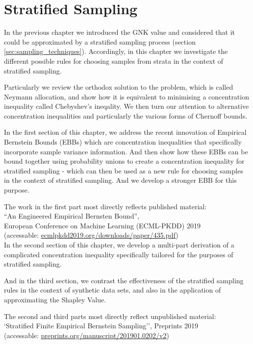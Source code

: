 \chapter{Stratified Sampling}\label{chap:stratified_sampling_chapter}

In the previous chapter we introduced the GNK value and considered that it could be approximated by a stratified sampling process (section \ref{sec:sampling_techniques}).
Accordingly, in this chapter we investigate the different possible rules for choosing samples from strata in the context of stratified sampling.

Particularly we review the orthodox solution to the problem, which is called Neymann allocation, and show how it is equivalent to minimising a concentration inequality called Chebyshev's ineqality.
We then turn our attention to alternative concentration inequalities and particularly the various forms of Chernoff bounds.

In the first section of this chapter, we address the recent innovation of Empirical Bernstein Bounds (EBBs) which are concentration inequalities that specifically incorporate sample variance information.
And then show how these EBBs can be bound together using probability unions to create a concentration inequality for stratified sampling - which can then be used as a new rule for choosing samples in the context of stratified sampling.
And we develop a stronger EBB for this purpose.

The work in the first part most directly reflects published material: \\\-\hspace{1cm}``An Engineered Empirical Bernsten Bound'',\\ European Conference on Machine Learning (ECML-PKDD) 2019\\(accessable: \href{http://ecmlpkdd2019.org/downloads/paper/435.pdf}{ecmlpkdd2019.org/downloads/paper/435.pdf})\\

In the second section of this chapter, we develop a multi-part derivation of a complicated concentration inequality specifically tailored for the purposes of stratified sampling.

And in the third section, we contrast the effectiveness of the stratified sampling rules in the context of synthetic data sets, and also in the application of approximating the Shapley Value.

The second and third parts most directly reflect unpublished material: \\\-\hspace{1cm}`Stratified Finite Empirical Bernstein Sampling'', Preprints 2019\\
(accessable: \href{preprints.org/manuscript/201901.0202/v2}{preprints.org/manuscript/201901.0202/v2})\\

